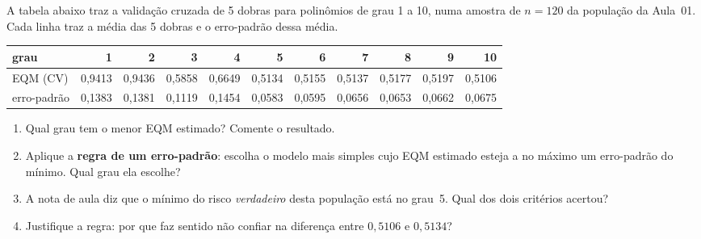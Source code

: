 \documentclass[11pt,a4paper]{article}
\begin{document}
\begin{exercicio}
A tabela abaixo traz a validação cruzada de 5 dobras para polinômios de grau 1 a
10, numa amostra de $n=120$ da população da Aula~01. Cada linha traz a média das
5 dobras e o erro-padrão dessa média.

\begin{center}\small
\renewcommand{\arraystretch}{1.2}
\begin{tabular}{@{}lrrrrrrrrrr@{}}
\toprule
grau & 1 & 2 & 3 & 4 & 5 & 6 & 7 & 8 & 9 & 10 \\
\midrule
EQM (CV) & 0{,}9413 & 0{,}9436 & 0{,}5858 & 0{,}6649 & 0{,}5134 & 0{,}5155 & 0{,}5137 & 0{,}5177 & 0{,}5197 & 0{,}5106 \\
erro-padrão & 0{,}1383 & 0{,}1381 & 0{,}1119 & 0{,}1454 & 0{,}0583 & 0{,}0595 & 0{,}0656 & 0{,}0653 & 0{,}0662 & 0{,}0675 \\
\bottomrule
\end{tabular}
\end{center}

\begin{enumerate}[label=(\alph*),leftmargin=1.1cm]
  \item Qual grau tem o menor EQM estimado? Comente o resultado.
  \item Aplique a \textbf{regra de um erro-padrão}: escolha o modelo mais simples
        cujo EQM estimado esteja a no máximo um erro-padrão do mínimo. Qual grau
        ela escolhe?
  \item A nota de aula diz que o mínimo do risco \emph{verdadeiro} desta
        população está no grau~5. Qual dos dois critérios acertou?
  \item Justifique a regra: por que faz sentido não confiar na diferença entre
        $0{,}5106$ e $0{,}5134$?
\end{enumerate}
\end{exercicio}
\end{document}
